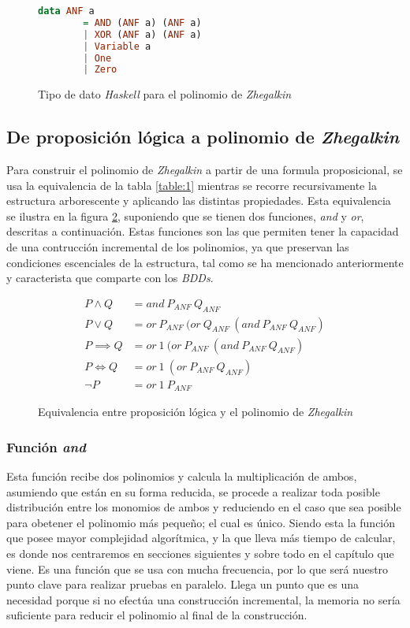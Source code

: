 \begin{figure}
\begin{lstlisting}[language=Haskell]
    data ANF a
        = AND (ANF a) (ANF a)
        | XOR (ANF a) (ANF a)
        | Variable a
        | One
        | Zero
\end{lstlisting}
\caption{Tipo de dato \textit{Haskell} para el polinomio de \textit{Zhegalkin}}
\label{code:anf}
\end{figure}

\subsection{De proposición lógica a polinomio de \textit{Zhegalkin}}
\label{sec:fromProp}

Para construir el polinomio de \textit{Zhegalkin} a partir de una formula proposicional, se usa la equivalencia de la tabla \ref{table:1} mientras se recorre recursivamente la estructura arborescente y aplicando las distintas propiedades. Esta equivalencia se ilustra en la figura \ref{fig:convert}, suponiendo que se tienen dos funciones, \textit{and} y \textit{or}, descritas a continuación. Estas funciones son las que permiten tener la capacidad de una contrucción incremental de los polinomios, ya que preservan las condiciones escenciales de la estructura, tal como se ha mencionado anteriormente y caracterista que comparte con los \textit{BDDs}.

\begin{figure}
\begin{align*}
P \land Q &= and\ P_{ANF}\ Q_{ANF}\\
P \lor Q &= or\ P_{ANF}\ (or\ Q_{ANF}\ (and\ P_{ANF}\ Q_{ANF})\\
P \implies Q &= or\ 1\ (or\ P_{ANF}\ (and\ P_{ANF}\ Q_{ANF})\\
P \iff Q &= or\ 1\ (or\ P_{ANF}\ Q_{ANF}) \\
\neg P &= or\ 1\ P_{ANF}
\end{align*}
\caption{Equivalencia entre proposición lógica y el polinomio de \textit{Zhegalkin}}
\label{fig:convert}
\end{figure}

\subsubsection{Función \textit{and}}

Esta función recibe dos polinomios y calcula la multiplicación de ambos, asumiendo que están en su forma reducida, se procede a realizar toda posible distribución entre los monomios de ambos y reduciendo en el caso que sea posible para obetener el polinomio más pequeño; el cual es único. Siendo esta la función que posee mayor complejidad algorítmica, y la que lleva más tiempo de calcular, es donde nos centraremos en secciones siguientes y sobre todo en el capítulo que viene. Es una función que se usa con mucha frecuencia, por lo que será nuestro punto clave para realizar pruebas en paralelo. Llega un punto que es una necesidad porque si no efectúa una construcción incremental, la memoria no sería suficiente para reducir el polinomio al final de la construcción.

